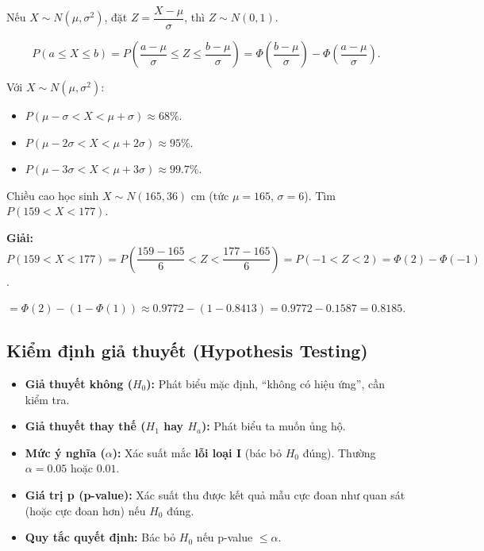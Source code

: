 \documentclass[12pt,a4paper]{article}
\begin{document}
\begin{phuongphap}[title={Chuẩn hóa (Standardization)}]
  Nếu $X \sim N(\mu, \sigma^2)$, đặt $Z = \dfrac{X - \mu}{\sigma}$, thì $Z \sim N(0,1)$.

  \[
    P(a \le X \le b) = P\!\left(\frac{a-\mu}{\sigma} \le Z \le \frac{b-\mu}{\sigma}\right) = \Phi\!\left(\frac{b-\mu}{\sigma}\right) - \Phi\!\left(\frac{a-\mu}{\sigma}\right).
  \]
\end{phuongphap}

\begin{tinhchat}[title={Quy tắc Empirical (68--95--99.7)}]
  Với $X \sim N(\mu, \sigma^2)$:
  \begin{itemize}
    \item $P(\mu - \sigma < X < \mu + \sigma) \approx 68\%$.
    \item $P(\mu - 2\sigma < X < \mu + 2\sigma) \approx 95\%$.
    \item $P(\mu - 3\sigma < X < \mu + 3\sigma) \approx 99.7\%$.
  \end{itemize}
\end{tinhchat}

\begin{vidu}
  Chiều cao học sinh $X \sim N(165, 36)$ cm (tức $\mu = 165$, $\sigma = 6$). Tìm $P(159 < X < 177)$.

  \medskip\textbf{Giải:}
  $P(159 < X < 177) = P\!\left(\dfrac{159-165}{6} < Z < \dfrac{177-165}{6}\right) = P(-1 < Z < 2) = \Phi(2) - \Phi(-1)$.

  $= \Phi(2) - (1 - \Phi(1)) \approx 0.9772 - (1 - 0.8413) = 0.9772 - 0.1587 = 0.8185$.
\end{vidu}

\subsection{Kiểm định giả thuyết (Hypothesis Testing)}

\begin{dinhnghia}[title={Khái niệm cơ bản}]
  \begin{itemize}
    \item \textbf{Giả thuyết không ($H_0$):} Phát biểu mặc định, ``không có hiệu ứng'', cần kiểm tra.
    \item \textbf{Giả thuyết thay thế ($H_1$ hay $H_a$):} Phát biểu ta muốn ủng hộ.
    \item \textbf{Mức ý nghĩa ($\alpha$):} Xác suất mắc \textbf{lỗi loại I} (bác bỏ $H_0$ đúng). Thường $\alpha = 0.05$ hoặc $0.01$.
    \item \textbf{Giá trị p (p-value):} Xác suất thu được kết quả mẫu cực đoan như quan sát (hoặc cực đoan hơn) nếu $H_0$ đúng.
    \item \textbf{Quy tắc quyết định:} Bác bỏ $H_0$ nếu p-value $\le \alpha$.
  \end{itemize}
\end{dinhnghia}
\end{document}
